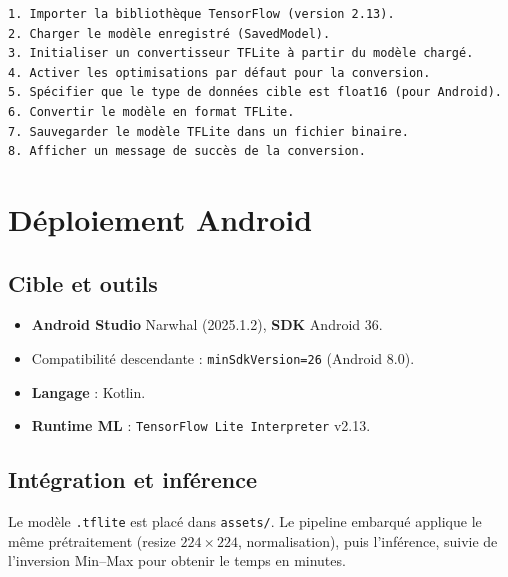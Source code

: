 \begin{verbatim}
1. Importer la bibliothèque TensorFlow (version 2.13).
2. Charger le modèle enregistré (SavedModel).
3. Initialiser un convertisseur TFLite à partir du modèle chargé.
4. Activer les optimisations par défaut pour la conversion.
5. Spécifier que le type de données cible est float16 (pour Android).
6. Convertir le modèle en format TFLite.
7. Sauvegarder le modèle TFLite dans un fichier binaire.
8. Afficher un message de succès de la conversion.
\end{verbatim}

\section{Déploiement Android}
\label{sec:deploiement_android}

\subsection{Cible et outils}
\begin{itemize}
	\item \textbf{Android Studio} Narwhal (2025.1.2), \textbf{SDK} Android 36.
	\item Compatibilité descendante : \texttt{minSdkVersion=26} (Android 8.0).
	\item \textbf{Langage} : Kotlin.
	\item \textbf{Runtime ML} : \texttt{TensorFlow Lite Interpreter} v2.13.
\end{itemize}

\subsection{Intégration et inférence}
Le modèle \texttt{.tflite} est placé dans \texttt{assets/}.
Le pipeline embarqué applique le même prétraitement (resize \(224\times224\), normalisation), puis l’inférence, suivie de l’inversion Min--Max pour obtenir le temps en minutes.

